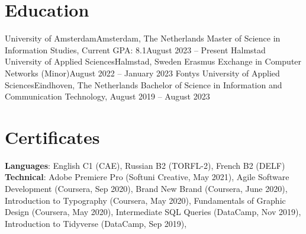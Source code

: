 \section{Education}
\resumeSubHeadingListStart
  \resumeSubheading
    {University of Amsterdam}{Amsterdam, The Netherlands}
    {Master of Science in Information Studies, Current GPA: 8.1}{August 2023 – Present}
    \resumeItemListStart
    \resumeItemListEnd
  \resumeSubheading
    {Halmstad University of Applied Sciences}{Halmstad, Sweden}
    {Erasmus Exchange in Computer Networks (Minor)}{August 2022 – January 2023}
    \resumeItemListStart
    \resumeItemListEnd
  \resumeSubheading
    {Fontys University of Applied Sciences}{Eindhoven, The Netherlands}
    {Bachelor of Science in Information and Communication Technology, }{August 2019 – August 2023}
    \resumeItemListStart
    \resumeItemListEnd
\resumeSubHeadingListEnd

\section{Certificates}
 \begin{itemize}[leftmargin=0.15in, label={}]
  \small{\item{
    \textbf{Languages}{: English C1 (CAE), Russian B2 (TORFL-2), French B2 (DELF)} \\
    \textbf{Technical}{: Adobe Premiere Pro (Softuni Creative, May 2021), Agile Software Development (Coursera, Sep 2020), Brand New Brand (Coursera, June 2020), Introduction to Typography (Coursera, May 2020), Fundamentals of Graphic Design (Coursera, May 2020), Intermediate SQL Queries (DataCamp, Nov 2019), Introduction to Tidyverse (DataCamp, Sep 2019), 
}}}
 \end{itemize}
